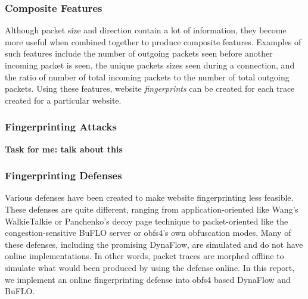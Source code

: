 \documentclass[11pt]{article}
\begin{document}
\subsubsection{Composite Features}
Although packet size and direction contain a lot of information, they become more useful when combined together to produce composite features. Examples of such features include the number of outgoing packets seen before another incoming packet is seen, the unique packets sizes seen during a connection, and the ratio of number of total incoming packets to the number of total outgoing packets. Using these features, website \textit{fingerprints} can be created for each trace created for a particular website.

\subsubsection{Fingerprinting Attacks}
\textbf{Task for me: talk about this}

\subsubsection{Fingerprinting Defenses}
Various defenses have been created to make website fingerprinting less feasible. These defenses are quite different, ranging from application-oriented like Wang's WalkieTalkie\cite{walkietalkie} or Panchenko's decoy page technique\cite{wang} to packet-oriented like the congestion-sensitive BuFLO server\cite{buflo} or obfs4's own obfuscation modes. Many of these defenses, including the promising DynaFlow\cite{dynaflow}, are simulated and do not have online implementations. In other words, packet traces are morphed offline to simulate what would been produced by using the defense online. In this report, we implement an online fingerprinting defense into obfs4 based DynaFlow and BuFLO.
\end{document}

